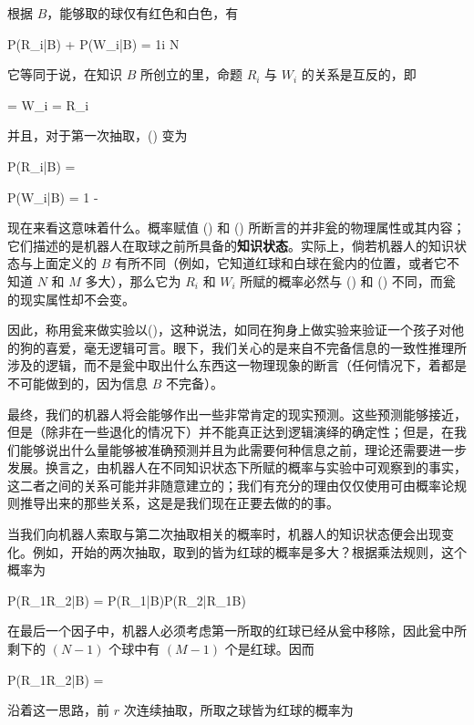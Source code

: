 根据 $B$，能够取的球仅有红色和白色，有

\placeformula[3-6]
\startformula
P(R_i|B) + P(W_i|B) = 1\quad{}\le i \le N
\stopformula

它等同于说，在知识 $B$ 所创立的里，命题 $R_i$ 与 $W_i$ 的关系是互反的，即

\placeformula[3-7]
\startformula
{} = W_i\quad\quad {} = R_i
\stopformula

并且，对于第一次抽取，(\in[3-5]) 变为

\placeformula[3-8]
\startformula
P(R_i|B) = 
\stopformula

\placeformula[3-9]
\startformula
P(W_i|B) = 1 - 
\stopformula

现在来看这意味着什么。概率赋值 (\in[3-8]) 和 (\in[3-9]) 所断言的并非瓮的物理属性或其内容；它们描述的是机器人在取球之前所具备的{\bf 知识状态}。实际上，倘若机器人的知识状态与上面定义的 $B$ 有所不同（例如，它知道红球和白球在瓮内的位置，或者它不知道 $N$ 和 $M$ 多大），那么它为 $R_i$ 和 $W_i$ 所赋的概率必然与 (\in[3-8]) 和 (\in[3-9]) 不同，而瓮的现实属性却不会变。

因此，称用瓮来做实验以(\in[3-8])，这种说法，如同在狗身上做实验来验证一个孩子对他的狗的喜爱，毫无逻辑可言。眼下，我们关心的是来自不完备信息的一致性推理所涉及的逻辑，而不是瓮中取出什么东西这一物理现象的断言（任何情况下，着都是不可能做到的，因为信息 $B$ 不完备）。

最终，我们的机器人将会能够作出一些非常肯定的现实预测。这些预测能够接近，但是（除非在一些退化的情况下）并不能真正达到逻辑演绎的确定性；但是，在我们能够说出什么量能够被准确预测并且为此需要何种信息之前，理论还需要进一步发展。换言之，由机器人在不同知识状态下所赋的概率与实验中可观察到的事实，这二者之间的关系可能并非随意建立的；我们有充分的理由仅仅使用可由概率论规则推导出来的那些关系，这是是我们现在正要去做的的事。

当我们向机器人索取与第二次抽取相关的概率时，机器人的知识状态便会出现变化。例如，开始的两次抽取，取到的皆为红球的概率是多大？根据乘法规则，这个概率为

\placeformula[3-10]
\startformula
P(R_1R_2|B) = P(R_1|B)P(R_2|R_1B)
\stopformula

在最后一个因子中，机器人必须考虑第一所取的红球已经从瓮中移除，因此瓮中所剩下的 $(N - 1)$ 个球中有 $(M - 1)$ 个是红球。因而

\placeformula[3-11]
\startformula
P(R_1R_2|B) = 
\stopformula

沿着这一思路，前 $r$ 次连续抽取，所取之球皆为红球的概率为

